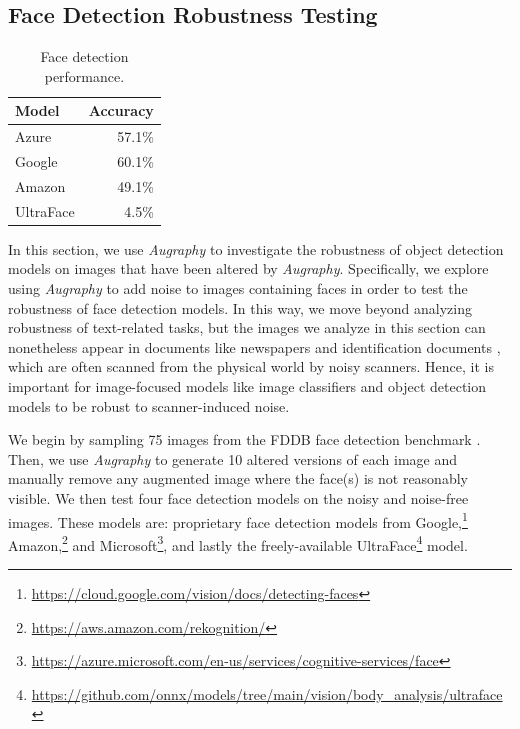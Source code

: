 \documentclass[runningheads]{llncs}
\begin{document}
\subsection{Face Detection Robustness Testing}
\begin{table}
    \centering
    \caption{Face detection performance.}
    \begin{tabular}{lr}
    \toprule
        \textbf{Model} & \textbf{Accuracy} \\
        \midrule
        Azure & 57.1\%\\
        Google & 60.1\%  \\
        Amazon & 49.1\% \\
        UltraFace & 4.5\%\\
        \bottomrule
    \end{tabular}
    \label{tab:face-detection-results}
\end{table}
In this section, we use \emph{Augraphy} to investigate the robustness of object detection models on images that have been altered by \emph{Augraphy}.
Specifically, we explore using \emph{Augraphy} to add noise to images containing faces in order to test the robustness of face detection models.
In this way, we move beyond analyzing robustness of text-related tasks, but the images we analyze in this section can nonetheless appear in documents like newspapers \cite{newspaper-navigator} and identification documents \cite{midv-500}, which are often scanned from the physical world by noisy scanners.
Hence, it is important for image-focused models like image classifiers and object detection models to be robust to scanner-induced noise.



We begin by sampling 75 images from the FDDB face detection benchmark \cite{fddbTech}.
Then, we use \emph{Augraphy} to generate 10 altered versions of each image and manually remove any augmented image where the face(s) is not reasonably visible.
We then test four face detection models on the noisy and noise-free images.
These models are: proprietary face detection models from Google,\footnote{\url{https://cloud.google.com/vision/docs/detecting-faces}} Amazon,\footnote{\url{https://aws.amazon.com/rekognition/}} and Microsoft\footnote{\url{https://azure.microsoft.com/en-us/services/cognitive-services/face}}, and lastly the freely-available UltraFace\footnote{\url{https://github.com/onnx/models/tree/main/vision/body_analysis/ultraface}} model.
\end{document}
